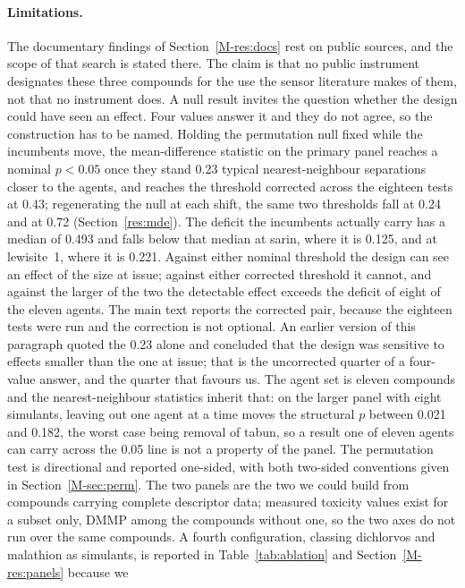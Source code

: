 \documentclass[11pt,a4paper]{article}
\begin{document}
\paragraph{Limitations.} The documentary findings of
Section~\ref{M-res:docs} rest on public sources, and the scope of that search
is stated there. The claim is that no public instrument designates these three
compounds for the use the sensor literature makes of them, not that no
instrument does. A null result invites the question whether the design could have seen an
effect. Four values answer it and they do not agree, so the construction has to
be named. Holding the permutation null fixed while the incumbents move, the
mean-difference statistic on the primary panel reaches a nominal $p<0.05$ once
they stand 0.23 typical nearest-neighbour separations closer to the agents, and
reaches the threshold corrected across the eighteen tests at 0.43; regenerating
the null at each shift, the same two thresholds fall at 0.24 and at 0.72
(Section~\ref{res:mde}). The deficit the incumbents actually carry has a median
of 0.493 and falls below that median at sarin, where it is 0.125, and at
lewisite~1, where it is 0.221. Against either nominal threshold the design can
see an effect of the size at issue; against either corrected threshold it
cannot, and against the larger of the two the detectable effect exceeds the
deficit of eight of the eleven agents. The main text reports the corrected pair,
because the eighteen tests were run and the correction is not optional. An
earlier version of this paragraph quoted the 0.23 alone and concluded that the
design was sensitive to effects smaller than the one at issue; that is the
uncorrected quarter of a four-value answer, and the quarter that favours us. The
agent set is eleven compounds and the nearest-neighbour statistics inherit that:
on the larger panel with eight simulants, leaving out one agent at a time moves
the structural $p$ between 0.021 and 0.182, the worst case being removal of
tabun, so a result one of eleven agents can carry across the 0.05 line is not a
property of the panel. The
permutation test is directional and reported one-sided, with both two-sided
conventions given in Section~\ref{M-sec:perm}. The two panels are the two we could
build from compounds carrying complete descriptor data; measured toxicity values
exist for a subset only, DMMP among the compounds without one, so the two axes do
not run over the same compounds. A fourth configuration,
classing dichlorvos and malathion as simulants, is reported in
Table~\ref{tab:ablation} and Section~\ref{M-res:panels} because we
\end{document}
